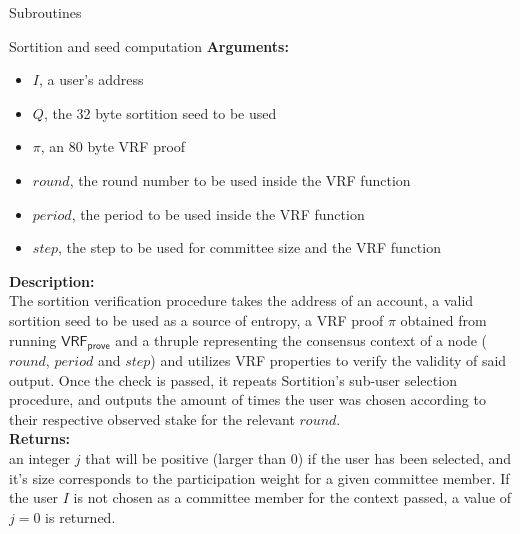 \documentclass[10pt,a4paper]{article}
\begin{document}
\begin{section}{Subroutines}
\begin{subsection}{Sortition and seed computation}
\noindent \textbf{Arguments:}
\begin{itemize}
    \item $I$, a user's address
    \item $Q$, the 32 byte sortition seed to be used
    \item $\pi$, an 80 byte VRF proof
    \item $round$, the round number to be used inside the VRF function
    \item $period$, the period to be used inside the VRF function
    \item $step$, the step to be used for committee size and the VRF function
  \end{itemize}

\noindent \textbf{Description:}\\
The sortition verification procedure takes the address of an account,
a valid sortition seed to be used as a source of entropy,
a VRF proof $\pi$ obtained from running $\mathsf{VRF_{prove}}$ and 
a thruple representing the consensus context of a node ($round$, $period$ and $step$) and utilizes 
VRF properties to verify the validity of said output.
Once the check is passed, it repeats Sortition's sub-user selection procedure, 
and outputs the amount of times the user was chosen according to their respective 
observed stake for the relevant $round$.\\

\noindent \textbf{Returns:} \\
an integer $j$ that will be positive (larger than 0) if the user has been 
    selected, and it's size corresponds to the participation weight for a given committee member.
    If the user $I$ is not chosen as a committee member for the context passed, 
    a value of $j = 0$ is returned.

\end{subsection}


\end{section}
\end{document}
